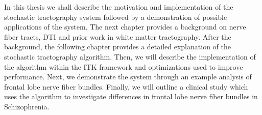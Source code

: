 In this thesis we shall describe the motivation and implementation of the stochastic tractography system followed by a demonstration of possible applications of the system.  The next chapter  provides a background on nerve fiber tracts, DTI and prior work in white matter tractography.  After the background, the following chapter provides a detailed explanation of the stochastic tractography algorithm.  Then, we will describe the implementation of the algorithm within the ITK framework and optimizations used to improve performance.  Next, we demonstrate the system through an example analysis of frontal lobe nerve fiber bundles.  Finally, we will outline a clinical study which uses the algorithm to investigate differences in frontal lobe nerve fiber bundles in Schizophrenia.
